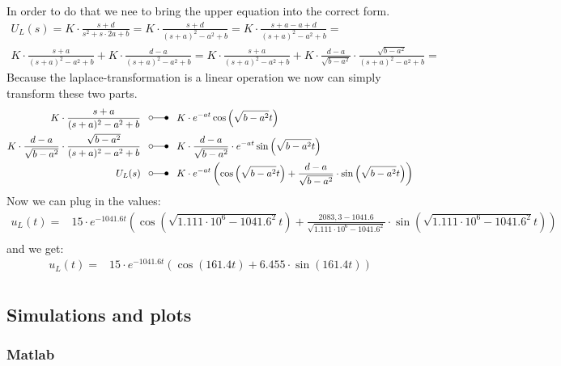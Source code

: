 \documentclass[a4paper]{article}
\begin{document}
In order to do that we nee to bring the upper equation into the correct form.
\begin{align*}
	U_L(s) = K\cdot \frac{s+d}{s^2+s\cdot 2a+b} = K\cdot \frac{s+d}{(s+a)^2-a^2+b} = 
	K\cdot \frac{s+a-a+d}{(s+a)^2-a^2+b} =\\
	K\cdot \frac{s+a}{(s+a)^2-a^2+b} + K\cdot \frac{d-a}{(s+a)^2-a^2+b} = 
	K\cdot \frac{s+a}{(s+a)^2-a^2+b} + K\cdot \frac{d-a}{\sqrt{b-a^2}} \cdot \frac{\sqrt{b-a^2}}{(s+a)^2-a^2+b} = 
\end{align*}
Because the laplace-transformation is a linear operation we now can simply transform these two parts.
\begin{align*}
	K\cdot \frac{s+a}{(s+a)^2-a^2+b} \;\;\; &\laplace \;\;\; K\cdot e^{-at}\cos \left(\sqrt{b-a^2}t \right)\\
	K\cdot \frac{d-a}{\sqrt{b-a^2}} \cdot \frac{\sqrt{b-a^2}}{(s+a)^2-a^2+b} \;\;\; &\laplace \;\;\;
	K\cdot \frac{d-a}{\sqrt{b-a^2}} \cdot e^{-at}\sin \left(\sqrt{b-a^2}t \right)\\
	U_L(s) \;\;\; &\laplace \;\;\; K\cdot e^{-at} \left(\cos \left(\sqrt{b-a^2}t \right) + 
	\frac{d-a}{\sqrt{b-a^2}} \cdot \sin\left(\sqrt{b-a^2}t\right) \right)\\
\end{align*}
Now we can plug in the values:
\begin{align*}
	u_L(t) =& 15\cdot e^{-1041.6t} \left(\cos \left(\sqrt{1.111\cdot 10^{6}-1041.6^2}t \right) + 
	\frac{2083,3-1041.6}{\sqrt{1.111\cdot 10^{6}-1041.6^2}} \cdot \sin\left(\sqrt{1.111\cdot 10^{6}-1041.6^2}t\right) \right)\\
\end{align*}
and we get:
\begin{align*}
	u_L(t) =& 15\cdot e^{-1041.6t} \left(\cos(161.4t) + 
	6.455 \cdot \sin\left(161.4t\right) \right)\\
\end{align*}

\subsection{Simulations and plots}
\subsubsection{Matlab}

\end{document}
